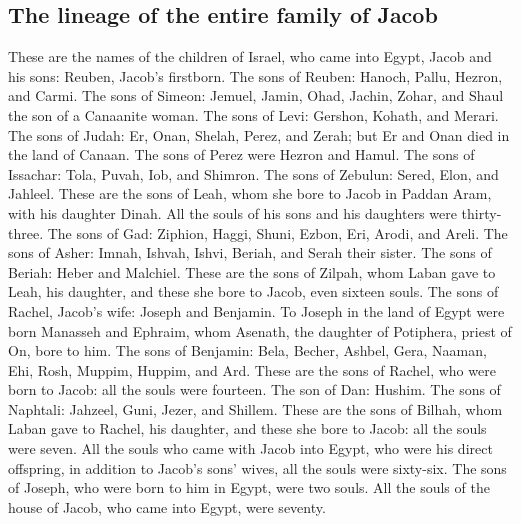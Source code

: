 \begin{paracol}{2}
\begin{otherlanguage}{english}
\hypertarget{the-lineage-of-the-entire-family-of-jacob}{%
\subsection{The lineage of the entire family of
Jacob}\label{the-lineage-of-the-entire-family-of-jacob}}

 These are the names of the children of Israel, who came
into Egypt, Jacob and his sons: Reuben, Jacob's firstborn.
 The sons of Reuben: Hanoch, Pallu, Hezron, and Carmi.
 The sons of Simeon: Jemuel, Jamin, Ohad, Jachin, Zohar,
and Shaul the son of a Canaanite woman.  The sons of
Levi: Gershon, Kohath, and Merari.  The sons of Judah:
Er, Onan, Shelah, Perez, and Zerah; but Er and Onan died in the land of
Canaan. The sons of Perez were Hezron and Hamul.  The
sons of Issachar: Tola, Puvah, Iob, and Shimron.  The
sons of Zebulun: Sered, Elon, and Jahleel.  These are the
sons of Leah, whom she bore to Jacob in Paddan Aram, with his daughter
Dinah. All the souls of his sons and his daughters were thirty-three.
 The sons of Gad: Ziphion, Haggi, Shuni, Ezbon, Eri,
Arodi, and Areli.  The sons of Asher: Imnah, Ishvah,
Ishvi, Beriah, and Serah their sister. The sons of Beriah: Heber and
Malchiel.  These are the sons of Zilpah, whom Laban gave
to Leah, his daughter, and these she bore to Jacob, even sixteen souls.
 The sons of Rachel, Jacob's wife: Joseph and Benjamin.
 To Joseph in the land of Egypt were born Manasseh and
Ephraim, whom Asenath, the daughter of Potiphera, priest of On, bore to
him.  The sons of Benjamin: Bela, Becher, Ashbel, Gera,
Naaman, Ehi, Rosh, Muppim, Huppim, and Ard.  These are
the sons of Rachel, who were born to Jacob: all the souls were fourteen.
 The son of Dan: Hushim.  The sons of
Naphtali: Jahzeel, Guni, Jezer, and Shillem.  These are
the sons of Bilhah, whom Laban gave to Rachel, his daughter, and these
she bore to Jacob: all the souls were seven.  All the
souls who came with Jacob into Egypt, who were his direct offspring, in
addition to Jacob's sons' wives, all the souls were sixty-six.
 The sons of Joseph, who were born to him in Egypt, were
two souls. All the souls of the house of Jacob, who came into Egypt,
were seventy.

\hypertarget{josuxe9-greets-his-father-in-gosen}{%
}
\end{otherlanguage}
\end{paracol}
